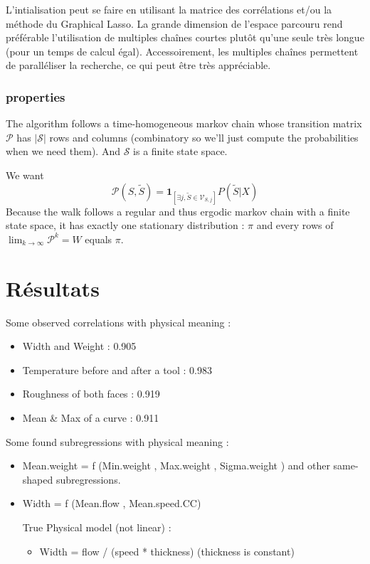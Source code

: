 \documentclass[12pt]{article}
\begin{document}
 
L'intialisation peut se faire en utilisant la matrice des corrélations et/ou la méthode du Graphical Lasso\cite{friedman2008sparse}.		
La grande dimension de l'espace parcouru rend préférable l'utilisation de multiples chaînes courtes plutôt qu'une seule très longue (pour un temps de calcul égal). Accessoirement, les multiples chaînes permettent de paralléliser la recherche, ce qui peut être très appréciable.


	\subsubsection{properties}
	The algorithm follows a time-homogeneous markov chain whose transition matrix $\mathcal{P}$ has $|\mathcal{S}|$ rows and columns (combinatory so we'll just compute the probabilities when we need them).
	And $\mathcal{S}$ is a finite state space.%
	
We want 
		\begin{equation}
			\mathcal{P}(S,\tilde{S})=\mathbf{1}_{[\exists j, \tilde{S} \in \mathcal{V}_{S,j} ]} P(\tilde{S}|X)
		\end{equation}
			Because the walk follows a regular and thus ergodic markov chain with a finite state space, it has exactly one stationary distribution \cite{grinstead1997introduction} : $\pi$ and every rows of $\operatorname{lim}_{k\rightarrow \infty}\mathcal{P}^k=W$ equals $\pi$.


\section{Résultats}	


Some observed correlations with physical meaning :
			\begin{itemize}
				\item Width and Weight : 0.905
				\item Temperature before and after a tool : 0.983 
				\item Roughness of both faces : 0.919
				\item Mean \& Max of a curve : 0.911
			\end{itemize}
			
Some found subregressions with physical meaning :
			\begin{itemize}
				\item Mean.weight = f (Min.weight , Max.weight , Sigma.weight ) and other same-shaped subregressions.
				\item Width = f (Mean.flow , Mean.speed.CC)
				
True Physical model (not linear) :\begin{itemize}
\item Width = flow / (speed * thickness) (thickness is constant)
\end{itemize} 
			\end{itemize}
			
\end{document}
